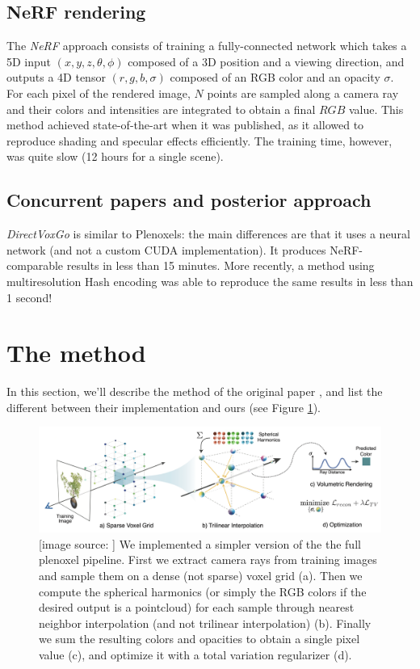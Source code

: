 \documentclass{article}
\begin{document}
\subsection{NeRF rendering}

The \textit{NeRF} \cite{nerf} approach consists of training a fully-connected network which takes a 5D input $(x,y,z,\theta,\phi)$ composed of a 3D position and a viewing direction, and outputs a 4D tensor $(r, g, b, \sigma)$ composed of an RGB color and an opacity $\sigma$. For each pixel of the rendered image, $N$ points are sampled along a camera ray and their colors and intensities are integrated to obtain a final $RGB$ value. This method achieved state-of-the-art when it was published, as it allowed to reproduce shading and specular effects efficiently. The training time, however, was quite slow (12 hours for a single scene).

\subsection{Concurrent papers and posterior approach}

\textit{DirectVoxGo} \cite{directvoxgo} is similar to Plenoxels: the main differences are that it uses a neural network (and not a custom CUDA implementation). It produces NeRF-comparable results in less than 15 minutes. More recently, a method using multiresolution Hash encoding \cite{instant} was able to reproduce the same results in less than 1 second!

\section{The method}

In this section, we'll describe the method of the original paper \cite{plenoxels}, and list the different between their implementation and ours (see Figure \ref{fig:plenoxel}).



\begin{figure}[!h]
\centering
\includegraphics[width=1.\textwidth]{figs/plen_pipeline.png}
\caption{\label{fig:plenoxel} [image source: \cite{plenoxels}] We implemented a simpler version of the the full plenoxel pipeline. First we extract camera rays from training images and sample them on a dense (not sparse) voxel grid (a). Then we compute the spherical harmonics (or simply the RGB colors if the desired output is a pointcloud) for each sample through nearest neighbor interpolation (and not trilinear interpolation) (b). Finally we sum the resulting colors and opacities to obtain a single pixel value (c), and optimize it with a total variation regularizer (d).}
\end{figure}
\end{document}
